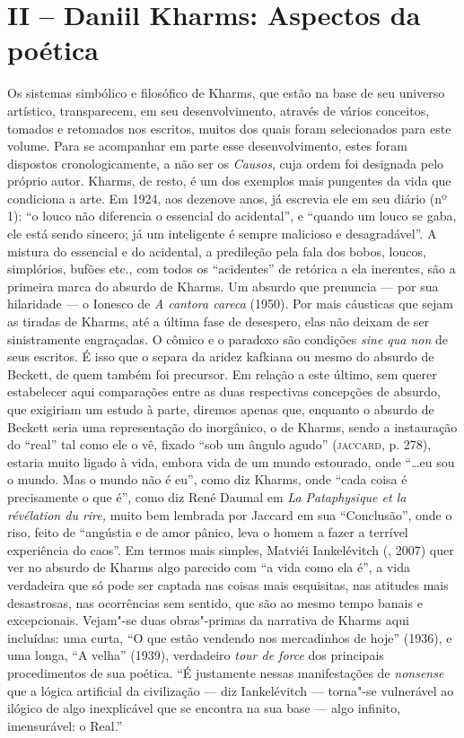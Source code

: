 \section{II -- Daniil Kharms: Aspectos da poética}

Os sistemas simbólico e filosófico de Kharms, que estão na base de seu
universo artístico, transparecem, em seu desenvolvimento, através de
vários conceitos, tomados e retomados nos escritos, muitos dos quais
foram selecionados para este volume. Para se acompanhar em parte esse
desenvolvimento, estes foram dispostos cronologicamente, a não ser os
\emph{Causos}, cuja ordem foi designada pelo próprio autor. Kharms, de
resto, é um dos exemplos mais pungentes da vida que condiciona a arte.
Em 1924, aos dezenove anos, já escrevia ele em seu diário (nº 1): ``o
louco não diferencia o essencial do acidental'', e ``quando um louco se
gaba, ele está sendo sincero; já um inteligente é sempre malicioso e
desagradável''. A mistura do essencial e do acidental, a predileção pela
fala dos bobos, loucos, simplórios, bufões etc., com todos os
``acidentes'' de retórica a ela inerentes, são a primeira marca do
absurdo de Kharms. Um absurdo que prenuncia --- por sua hilaridade --- o
Ionesco de \emph{A cantora careca} (1950). Por mais cáusticas que sejam
as tiradas de Kharms, até a última fase de desespero, elas não deixam de
ser sinistramente engraçadas. O cômico e o paradoxo são condições
\emph{sine qua non} de seus escritos. É isso que o separa da aridez
kafkiana ou mesmo do absurdo de Beckett, de quem também foi precursor.
Em relação a este último, sem querer estabelecer aqui comparações entre
as duas respectivas concepções de absurdo, que exigiriam um estudo à
parte, diremos apenas que, enquanto o absurdo de Beckett seria uma
representação do inorgânico, o de Kharms, sendo a instauração do
``real'' tal como ele o vê, fixado ``sob um ângulo agudo''
(\textsc{jaccard}, p. 278), estaria muito ligado à vida, embora vida de
um mundo estourado, onde ``\ldots{}eu sou o mundo. Mas o mundo não é eu'',
como diz Kharms, onde ``cada coisa é precisamente o que é'', como diz
René Daumal em \emph{La Pataphysique et la révélation du rire,} muito
bem lembrada por Jaccard em sua ``Conclusão'', onde o riso, feito de
``angústia e de amor pânico, leva o homem a fazer a terrível experiência
do caos''. Em termos mais simples, Matviéi Iankelévitch (,
2007) quer ver no absurdo de Kharms algo parecido com ``a vida como ela
é'', a vida verdadeira que só pode ser captada nas coisas mais
esquisitas, nas atitudes mais desastrosas, nas ocorrências sem sentido,
que são ao mesmo tempo banais e excepcionais. Vejam"-se duas obras"-primas
da narrativa de Kharms aqui incluídas: uma curta, ``O que estão vendendo
nos mercadinhos de hoje'' (1936), e uma longa, ``A velha'' (1939),
verdadeiro \emph{tour de force} dos principais procedimentos de sua
poética. ``É justamente nessas manifestações de \emph{nonsense} que a
lógica artificial da civilização --- diz Iankelévitch --- torna"-se
vulnerável ao ilógico de algo inexplicável que se encontra na sua base
--- algo infinito, imensurável: o Real.''

